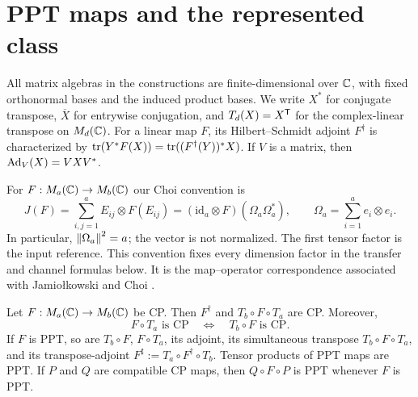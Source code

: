 \section{PPT maps and the represented class}\label{sec:foundations}

All matrix algebras in the constructions are finite-dimensional over
$\mathbb C$, with fixed orthonormal bases and the induced product bases.  We write
$X^*$ for conjugate transpose, $\overline X$ for entrywise conjugation, and
$T_d(X)=X^{\mathsf T}$ for the complex-linear transpose on $M_{d}(\mathbb C)$.  For a linear
map $F$, its Hilbert--Schmidt adjoint $F^\dagger$ is characterized by
$\operatorname{tr}(Y^*F(X))=\operatorname{tr}((F^\dagger(Y))^*X)$.  If $V$ is a matrix, then
$\operatorname{Ad}_V(X)=VXV^*$.

For $F:M_{a}(\mathbb C)\to M_{b}(\mathbb C)$ our Choi convention is
\begin{equation}\label{eq:choi-definition}
 J(F)=\sum_{i,j=1}^a E_{ij}\otimes F(E_{ij})
     =(\mathrm{id}_a\otimes F)(\Omega_a\Omega_a^*),
 \qquad \Omega_a=\sum_{i=1}^a e_i\otimes e_i.
\end{equation}
In particular, $\left\lVert\Omega_a\right\rVert^2=a$; the vector is not normalized.  The
first tensor factor is the input reference.  This convention fixes every
dimension factor in the transfer and channel formulas below.
It is the map--operator correspondence associated with Jamiołkowski and
Choi \cite{Jamiolkowski1972,Choi1975}.

\begin{lemma}\label{lem:ppt-stability}
Let $F:M_{a}(\mathbb C)\to M_{b}(\mathbb C)$ be CP.  Then $F^\dagger$ and
$T_b\circ F\circ T_a$ are CP.  Moreover,
\[
 F\circ T_a\text{ is CP}\quad\Longleftrightarrow\quad
 T_b\circ F\text{ is CP}.
\]
If $F$ is PPT, so are $T_b\circ F$, $F\circ T_a$, its adjoint, its
simultaneous transpose $T_b\circ F\circ T_a$, and its transpose-adjoint
$F^\sharp:=T_a\circ F^\dagger\circ T_b$.  Tensor products of PPT maps
are PPT.  If $P$ and $Q$ are compatible CP maps, then $Q\circ F\circ P$
is PPT whenever $F$ is PPT.
\end{lemma}

